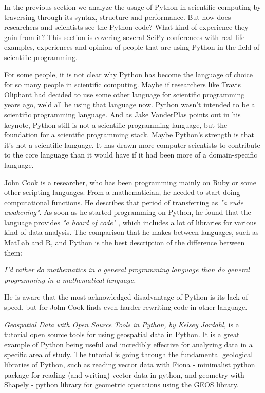 In the previous section we analyze the usage of Python in scientific computing by traversing through its syntax, structure and performance. But how does researchers and scientists see the Python code? What kind of experience they gain from it? This section is covering several SciPy conferences with real life examples, experiences and opinion of people that are using Python in the field of scientific programming.

For some people, it is not clear why Python has become the language of choice for so many people in scientific computing. Maybe if researchers like Travis Oliphant had decided to use some other language for scientific programming years ago, we’d all be using that language now. Python wasn’t intended to be a scientific programming language. And as Jake VanderPlas points out in his keynote, Python still is not a scientific programming language, but the foundation for a scientific programming stack. Maybe Python’s strength is that it’s not a scientific language. It has drawn more computer scientists to contribute to the core language than it would have if it had been more of a domain-specific language.

John Cook is a researcher, who has been programming mainly on Ruby or some other scripting languages. From a mathematician, he needed to start doing computational functions. He describes that period of transferring as \textit{"a rude awakening"}.\cite{johnSciPy} As soon as he started programming on Python, he found that the language provides \textit{"a hoard of code"} \cite{johnSciPy}, which includes a lot of libraries for various kind of data analysis. The comparison that he makes between languages, such as MatLab and R, and Python is the best description of the difference between them:

\textit{I’d rather do mathematics in a general programming language than do general programming in a mathematical language.}

He is aware that the most acknowledged disadvantage of Python is its lack of speed, but for John Cook finds even harder rewriting code in other language. 

\textit{Geospatial Data with Open Source Tools in Python, by Kelsey Jordahl,} is a tutorial open source tools for using geospatial data in Python. \cite{efficientPython} It is a great example of Python being useful and incredibly effective for analyzing data in a specific area of study. The tutorial is going through the fundamental geological libraries of Python, such as reading vector data with Fiona - minimalist python package for reading (and writing) vector data in python, and geometry with Shapely - python library for geometric operations using the GEOS library. 

